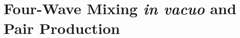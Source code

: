 \documentclass[11pt,SymmetricalJury]{inrsthesis/inrsthesis}
\begin{document}

\chapter{Four-Wave Mixing \textit{in vacuo} and Pair Production}
\label{chapter:fwm}
\end{document}
